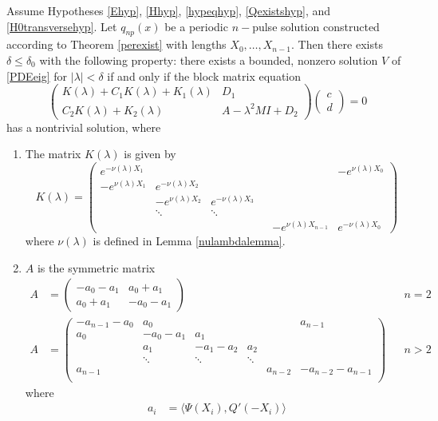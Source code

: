 \documentclass[thesis.tex]{subfiles}
\begin{document}
\begin{theorem}\label{blockmatrixtheorem}
Assume Hypotheses \ref{Ehyp}, \ref{Hhyp}, \ref{hypeqhyp}, \ref{Qexistshyp}, and \ref{H0transversehyp}. Let $q_{np}(x)$ be a periodic $n-$pulse solution constructed according to Theorem \ref{perexist} with lengths $X_0, \dots, X_{n-1}$. Then there exists $\delta \leq \delta_0$ with the following property: there exists a bounded, nonzero solution $V$ of \eqref{PDEeig} for $|\lambda| < \delta$ if and only if the block matrix equation
\begin{equation}\label{blockeq}
\begin{pmatrix}
K(\lambda) + C_1 K(\lambda) + K_1(\lambda) & D_1 \\
C_2 K(\lambda) + K_2(\lambda) & A - \lambda^2 MI + D_2
\end{pmatrix}
\begin{pmatrix} c \\ d \end{pmatrix} = 0
\end{equation}
has a nontrivial solution, where 

\begin{enumerate}
\item The matrix $K(\lambda)$ is given by
\begin{equation}
K(\lambda) = 
\begin{pmatrix}
e^{-\nu(\lambda)X_1} & & & & & -e^{\nu(\lambda)X_0} \\
-e^{\nu(\lambda)X_1} & e^{-\nu(\lambda)X_2} \\
& -e^{\nu(\lambda)X_2} & e^{-\nu(\lambda)X_3} \\
& \ddots & \ddots & &&  \\
& & & & -e^{\nu(\lambda)X_{n-1}} & e^{-\nu(\lambda)X_0} 
\end{pmatrix}
\end{equation}
where $\nu(\lambda)$ is defined in Lemma \ref{nulambdalemma}.

\item $A$ is the symmetric matrix
\begin{align}\label{Asymm}
A &= \begin{pmatrix}
-a_0 -a_1 & a_0 + a_1 \\
a_0 + a_1 & -a_0 - a_1
\end{pmatrix} && n = 2 \\
A &= \begin{pmatrix}
-a_{n-1} - a_0 & a_0 & & &  & a_{n-1}\\
a_0 & -a_0 - a_1 &  a_1 \\
& a_1 & -a_1 - a_2 &  a_2 \\
& \ddots & \ddots & \ddots \\
a_{n-1} & & & & a_{n-2} & -a_{n-2} - a_{n-1} \\
\end{pmatrix} && n > 2 \nonumber
\end{align}
where
\begin{align*}
a_i &= \langle \Psi(X_i), Q'(-X_i) \rangle \\
\end{align*}


\end{enumerate}
\end{theorem}
\end{document}
